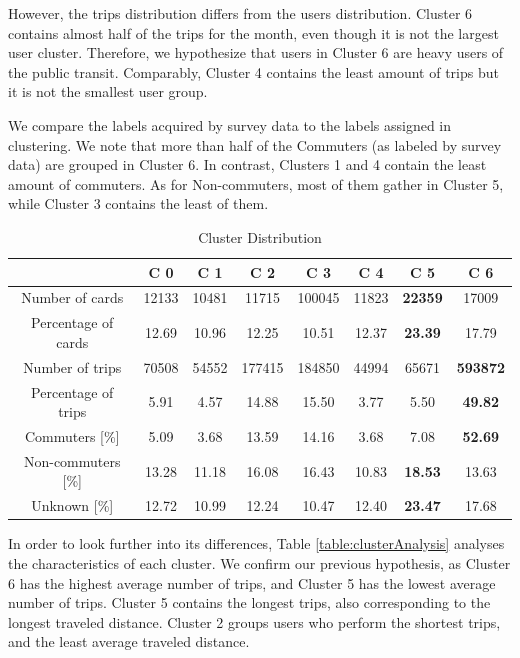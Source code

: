 \documentclass{article}
\begin{document}
However, the trips distribution differs from the users distribution. Cluster 6 contains almost half of the trips for the month, even though it is not the largest user cluster. Therefore, we hypothesize that users in Cluster 6 are heavy users of the public transit. Comparably, Cluster 4 contains the least amount of trips but it is not the smallest user group. 

We compare the labels acquired by survey data to the labels assigned in clustering. We note that more than half of the Commuters (as labeled by survey data) are grouped in Cluster 6. In contrast, Clusters 1 and 4 contain the least amount of commuters. As for Non-commuters, most of them gather in Cluster 5, while Cluster 3 contains the least of them.

\begin{table}[H]
\centering
\begin{tabular}{||c|c|c|c|c|c|c|c||}
\hline
 & \textbf{C 0} & \textbf{C 1} & \textbf{C 2} & \textbf{C 3} & \textbf{C 4}  & \textbf{C 5} & \textbf{C 6} \\
[0.5ex] 
\hline \hline
Number of cards & 12133 & 10481 & 11715 & 100045 & 11823 & \textbf{22359} & 17009 \\
Percentage of cards & 12.69 & 10.96 & 12.25 & 10.51 & 12.37 & \textbf{23.39} & 17.79 \\
\hline
Number of trips & 70508 & 54552 & 177415 & 184850 & 44994 & 65671 & \textbf{593872} \\
Percentage of trips & 5.91 & 4.57 & 14.88 & 15.50 & 3.77 & 5.50 & \textbf{49.82} \\
\hline
Commuters [\%] & 5.09 & 3.68 & 13.59 & 14.16 & 3.68 & 7.08 & \textbf{52.69} \\ 
Non-commuters [\%] & 13.28 & 11.18 & 16.08 & 16.43 & 10.83 & \textbf{18.53} & 13.63 \\ 
Unknown [\%] & 12.72 & 10.99 & 12.24 & 10.47 & 12.40 & \textbf{23.47} & 17.68 \\  [1ex]
\hline 
\end{tabular}
\caption{Cluster Distribution} %
\label{table:clusterDistribution}
\end{table}

In order to look further into its differences, Table \ref{table:clusterAnalysis} analyses the characteristics of each cluster. We confirm our previous hypothesis, as Cluster 6 has the highest average number of trips, and Cluster 5 has the lowest average number of trips. Cluster 5 contains the longest trips, also corresponding to the longest traveled distance. Cluster 2 groups users who perform the shortest trips, and the least average traveled distance. 
\end{document}
